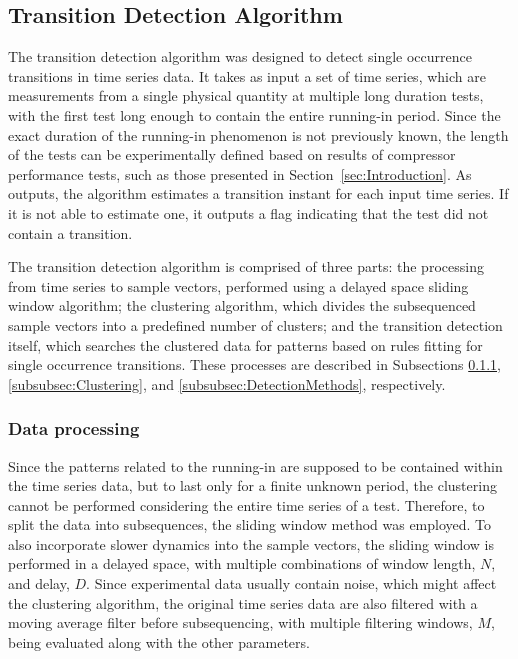 \documentclass[preprint,11pt,number]{elsarticle}
\begin{document}
\subsection{Transition Detection Algorithm}\label{subsec:TransitionDetectionAlgorithm}

The transition detection algorithm was designed to detect single occurrence transitions in time series data. It takes as input a set of time series, which are measurements from a single physical quantity at multiple long duration tests, with the first test long enough to contain the entire running-in period. Since the exact duration of the running-in phenomenon is not previously known, the length of the tests can be experimentally defined based on results of compressor performance tests, such as those presented in Section~\ref{sec:Introduction}. As outputs, the algorithm estimates a transition instant for each input time series. If it is not able to estimate one, it outputs a flag indicating that the test did not contain a transition.

The transition detection algorithm is comprised of three parts: the processing from time series to sample vectors, performed using a delayed space sliding window algorithm; the clustering algorithm, which divides the subsequenced sample vectors into a predefined number of clusters; and the transition detection itself, which searches the clustered data for patterns based on rules fitting for single occurrence transitions. These processes are described in Subsections \ref{subsubsec:DelayedSpaceSlidingWindowProcessing}, \ref{subsubsec:Clustering}, and \ref{subsubsec:DetectionMethods}, respectively.


\subsubsection{Data processing}\label{subsubsec:DelayedSpaceSlidingWindowProcessing}

Since the patterns related to the running-in are supposed to be contained within the time series data, but to last only for a finite unknown period, the clustering cannot be performed considering the entire time series of a test. Therefore, to split the data into subsequences, the sliding window method was employed. To also incorporate slower dynamics into the sample vectors, the sliding window is performed in a delayed space, with multiple combinations of window length, $N$, and delay, $D$. Since experimental data usually contain noise, which might affect the clustering algorithm, the original time series data are also filtered with a moving average filter before subsequencing, with multiple filtering windows, $M$, being evaluated along with the other parameters.
\end{document}
